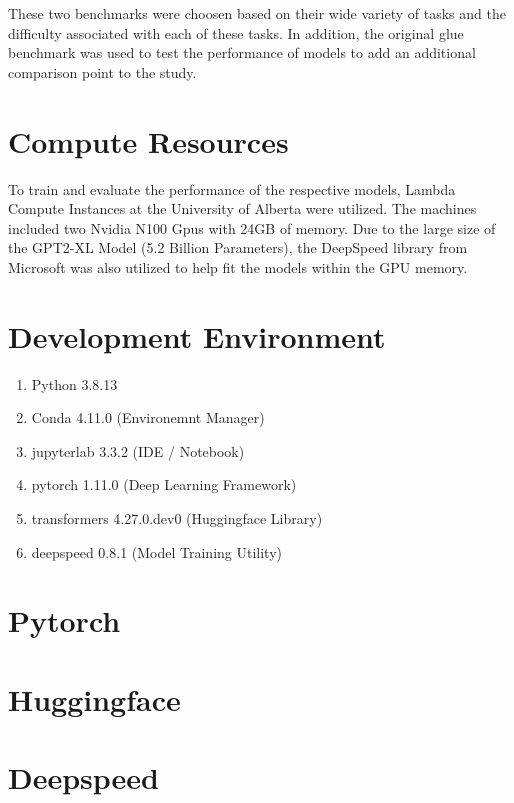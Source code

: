 \documentclass[\main/thesis.tex]{subfiles}
\begin{document}
These two benchmarks were choosen based on their wide variety of tasks and the difficulty 
associated with each of these tasks. In addition, the original glue benchmark was used to test the performance of 
models to add an additional comparison point to the study. 


\section{Compute Resources}\label{sec:computeResources}
To train and evaluate the performance of the respective models, Lambda Compute Instances at the University of Alberta 
were utilized. The machines included two Nvidia N100 Gpus with 24GB of memory. Due to the large size of the GPT2-XL 
Model (5.2 Billion Parameters), the DeepSpeed\cite{rajbhandari_zero_2020} library from Microsoft was also utilized to 
help fit the models within the GPU memory. 

\section{Development Environment}
\begin{enumerate}
    \item Python 3.8.13
    \item Conda 4.11.0 (Environemnt Manager)
    \item jupyterlab 3.3.2 (IDE / Notebook)
    \item pytorch 1.11.0 (Deep Learning Framework)
    \item transformers 4.27.0.dev0 (Huggingface Library)
    \item deepspeed 0.8.1 (Model Training Utility)
\end{enumerate}

\section{Pytorch}\label{sec:pytorch}

\section{Huggingface}\label{sec:huggingface}

\section{Deepspeed}\label{sec:deepspeed}
\end{document}
